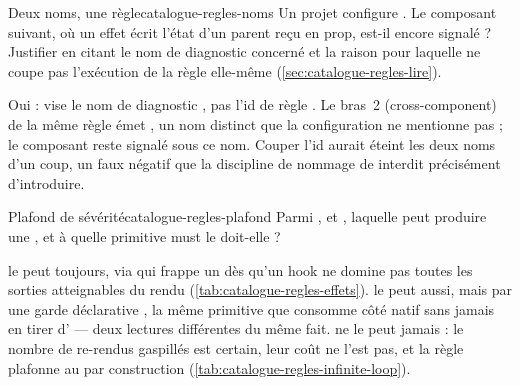 \begin{exercice}{Deux noms, une règle}{catalogue-regles-noms}
Un projet configure . Le composant suivant, où un effet écrit l'état d'un parent reçu en prop, est-il encore signalé ? Justifier en citant le nom de diagnostic concerné et la raison pour laquelle  ne coupe pas l'exécution de la règle elle-même (\cref{sec:catalogue-regles-lire}).
\end{exercice}

\begin{solution}
Oui :  vise le nom de diagnostic , pas l'id de règle . Le bras~2 (cross-component) de la même règle émet , un nom distinct que la configuration ne mentionne pas ; le composant reste signalé sous ce nom. Couper l'id aurait éteint les deux noms d'un coup, un faux négatif que la discipline de nommage de  interdit précisément d'introduire.
\end{solution}

\begin{exercice}{Plafond de sévérité}{catalogue-regles-plafond}
Parmi ,  et , laquelle peut produire une \Error{}, et à quelle primitive must le doit-elle ?
\end{exercice}

\begin{solution}
 le peut toujours, via  qui frappe un  dès qu'un hook ne domine pas toutes les sorties atteignables du rendu (\cref{tab:catalogue-regles-effets}).  le peut aussi, mais par une garde déclarative , la même primitive que  consomme côté natif sans jamais en tirer d'\Error{} --- deux lectures différentes du même fait.  ne le peut jamais : le nombre de re-rendus gaspillés est certain, leur coût ne l'est pas, et la règle plafonne au \Warning{} par construction (\cref{tab:catalogue-regles-infinite-loop}).
\end{solution}
